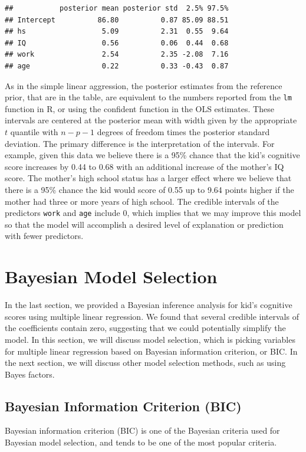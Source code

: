 \documentclass[]{book}
\theoremstyle{definition}
\theoremstyle{definition}
\theoremstyle{definition}
\theoremstyle{remark}
\begin{document}
\begin{verbatim}
##           posterior mean posterior std  2.5% 97.5%
## Intercept          86.80          0.87 85.09 88.51
## hs                  5.09          2.31  0.55  9.64
## IQ                  0.56          0.06  0.44  0.68
## work                2.54          2.35 -2.08  7.16
## age                 0.22          0.33 -0.43  0.87
\end{verbatim}

As in the simple linear aggression, the posterior estimates from the
reference prior, that are in the table, are equivalent to the numbers
reported from the \texttt{lm} function in R, or using the confident
function in the OLS estimates. These intervals are centered at the
posterior mean with width given by the appropriate \(t\) quantile with
\(n-p-1\) degrees of freedom times the posterior standard deviation. The
primary difference is the interpretation of the intervals. For example,
given this data we believe there is a 95\% chance that the kid's
cognitive score increases by 0.44 to 0.68 with an additional increase of
the mother's IQ score. The mother's high school status has a larger
effect where we believe that there is a 95\% chance the kid would score
of 0.55 up to 9.64 points higher if the mother had three or more years
of high school. The credible intervals of the predictors \texttt{work}
and \texttt{age} include 0, which implies that we may improve this model
so that the model will accomplish a desired level of explanation or
prediction with fewer predictors.

\section{Bayesian Model Selection}\label{bayesian-model-selection}

In the last section, we provided a Bayesian inference analysis for kid's
cognitive scores using multiple linear regression. We found that several
credible intervals of the coefficients contain zero, suggesting that we
could potentially simplify the model. In this section, we will discuss
model selection, which is picking variables for multiple linear
regression based on Bayesian information criterion, or BIC. In the next
section, we will discuss other model selection methods, such as using
Bayes factors.

\subsection{Bayesian Information Criterion
(BIC)}\label{bayesian-information-criterion-bic}

Bayesian information criterion (BIC) is one of the Bayesian criteria
used for Bayesian model selection, and tends to be one of the most
popular criteria.


\end{document}
